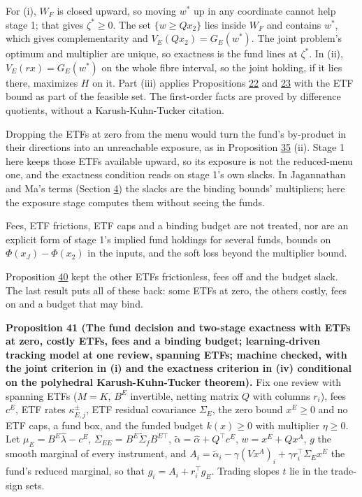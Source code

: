 \documentclass[11pt]{article}
\begin{document}
For (i), \(W_F\) is closed upward, so moving \(w^*\) up in any coordinate
cannot help stage 1; that gives \(\zeta^*\geq0\). The set \(\{w\geq Qx_2\}\) lies inside
\(W_F\) and contains \(w^*\), which gives complementarity and \(V_E(Qx_2)=G_E(w^*)\).
The joint problem's optimum and multiplier are unique, so exactness
is the fund lines at \(\zeta^*\). In (ii), \(V_E(rx)=G_E(w^*)\) on the whole fibre
interval, so the joint holding, if it lies there, maximizes \(H\) on it.
Part (iii) applies Propositions \hyperref[res:Proposition-22]{22} and \hyperref[res:Proposition-23]{23} with the ETF bound as part
of the feasible set. The first-order facts are proved by difference
quotients, without a Karush-Kuhn-Tucker citation.

Dropping the ETFs at zero from the menu would turn the fund's
by-product in their directions into an unreachable exposure, as in
Proposition \hyperref[res:Proposition-35]{35} (ii). Stage 1 here keeps those ETFs available upward,
so its exposure is not the reduced-menu one, and the exactness
condition reads on stage 1's own slacks. In Jagannathan and Ma's terms
(Section \hyperref[sec:4]{4}) the slacks are the binding bounds' multipliers; here the
exposure stage computes them without seeing the funds.

Fees, ETF frictions, ETF caps and a binding budget are not treated,
nor are an explicit form of stage 1's implied fund holdings for
several funds, bounds on \(\Phi(x_J)-\Phi(x_2)\) in the inputs, and the soft
loss beyond the multiplier bound.

Proposition \hyperref[res:Proposition-40]{40} kept the other ETFs frictionless, fees off and the
budget slack. The last result puts all of these back: some ETFs at
zero, the others costly, fees on and a budget that may bind.

\label{res:Proposition-41}
\textbf{Proposition 41 (The fund decision and two-stage exactness with ETFs at zero, costly ETFs, fees and a binding budget; learning-driven tracking model at one review, spanning ETFs; machine checked, with the joint criterion in (i) and the exactness criterion in (iv) conditional on the polyhedral Karush-Kuhn-Tucker theorem).}
Fix one review with spanning ETFs (\(M=K\), \(B^E\) invertible, netting
matrix \(Q\) with columns \(r_i\)), fees \(c^E\), ETF rates \(\kappa^\pm_{E,j}\), ETF residual
covariance \(\Sigma_E\), the zero bound \(x^E\geq0\) and no ETF caps, a fund box, and
the funded budget \(k(x)\geq0\) with multiplier \(\eta\geq0\). Let
\(\mu_E=B^E\hat\lambda-c^E\), \(\Sigma_{EE}=B^E\tilde\Sigma_fB^{E\top}\), \(\tilde\alpha=\hat\alpha+Q^\top c^E\), \(w=x^E+Qx^A\), \(g\) the
smooth marginal of every instrument, and
\(A_i=\tilde\alpha_i-\gamma(Vx^A)_i+\gamma r_i^\top\Sigma_Ex^E\) the fund's reduced marginal, so that
\(g_i=A_i+r_i^\top g_E\). Trading slopes \(t\) lie in the trade-sign sets.
\end{document}
